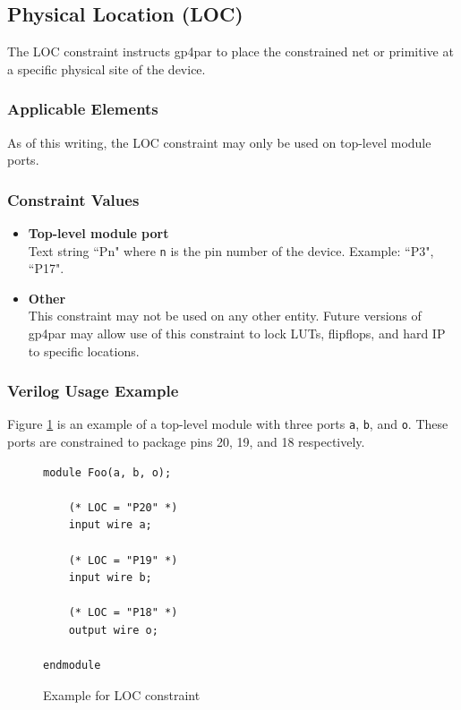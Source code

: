 \documentclass{article}
\begin{document}

\pagebreak
\subsection{Physical Location (LOC)}

The LOC constraint instructs gp4par to place the constrained net or primitive at a specific physical site of the 
device.

\subsubsection{Applicable Elements}
As of this writing, the LOC constraint may only be used on top-level module ports.

\subsubsection{Constraint Values}
\begin{itemize}
\item {\bfseries Top-level module port}\\
Text string ``Pn" where \texttt{n} is the pin number of the device. Example: ``P3", ``P17".
\item {\bfseries Other} \\
This constraint may not be used on any other entity. Future versions of gp4par may allow use of this constraint 
to lock LUTs, flipflops, and hard IP to specific locations.
\end{itemize}

\subsubsection{Verilog Usage Example}

Figure \ref{constraint-loc} is an example of a top-level module with three ports \texttt{a}, \texttt{b}, and \texttt{o}.
These ports are constrained to package pins 20, 19, and 18 respectively.

\begin{figure}[h]
\begin{lstlisting}
module Foo(a, b, o);

	(* LOC = "P20" *)
	input wire a;

	(* LOC = "P19" *)
	input wire b;

	(* LOC = "P18" *)
	output wire o;
	
endmodule
\end{lstlisting}
\caption{Example for LOC constraint}
\label{constraint-loc}
\end{figure}
\end{document}
